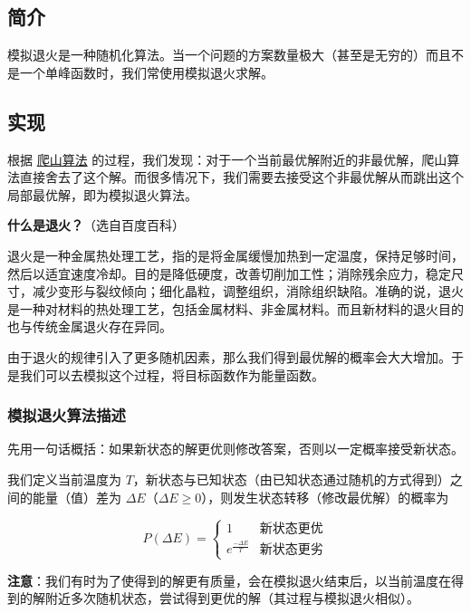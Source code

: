 
\subsection{简介}

模拟退火是一种随机化算法。当一个问题的方案数量极大（甚至是无穷的）而且不是一个单峰函数时，我们常使用模拟退火求解。

\hr

\subsection{实现}

根据 \href{/misc/hill-climbing/}{爬山算法} 的过程，我们发现：对于一个当前最优解附近的非最优解，爬山算法直接舍去了这个解。而很多情况下，我们需要去接受这个非最优解从而跳出这个局部最优解，即为模拟退火算法。

\begin{QUOTE}{}{}
\textbf{什么是退火？}（选自百度百科）



退火是一种金属热处理工艺，指的是将金属缓慢加热到一定温度，保持足够时间，然后以适宜速度冷却。目的是降低硬度，改善切削加工性；消除残余应力，稳定尺寸，减少变形与裂纹倾向；细化晶粒，调整组织，消除组织缺陷。准确的说，退火是一种对材料的热处理工艺，包括金属材料、非金属材料。而且新材料的退火目的也与传统金属退火存在异同。
\end{QUOTE}

由于退火的规律引入了更多随机因素，那么我们得到最优解的概率会大大增加。于是我们可以去模拟这个过程，将目标函数作为能量函数。

\subsubsection{模拟退火算法描述}

先用一句话概括：如果新状态的解更优则修改答案，否则以一定概率接受新状态。

我们定义当前温度为 $T$，新状态与已知状态（由已知状态通过随机的方式得到）之间的能量（值）差为 $\Delta E$（$\Delta E\geqslant 0$），则发生状态转移（修改最优解）的概率为

$$
P(\Delta E)=
\begin{cases}
1&\text{新状态更优}\\
e^\frac{-\Delta E}{T}&\text{新状态更劣}
\end{cases}
$$

\textbf{注意}：我们有时为了使得到的解更有质量，会在模拟退火结束后，以当前温度在得到的解附近多次随机状态，尝试得到更优的解（其过程与模拟退火相似）。

